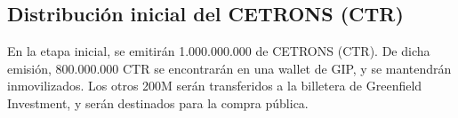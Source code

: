 \subsection{Distribución inicial del CETRONS (CTR)}
En la etapa inicial, se emitirán 1.000.000.000 de CETRONS (CTR). De dicha emisión, 800.000.000 CTR se encontrarán en una wallet de GIP, y se mantendrán inmovilizados. Los otros 200M serán transferidos a la billetera de Greenfield Investment, y serán destinados para la compra pública.
